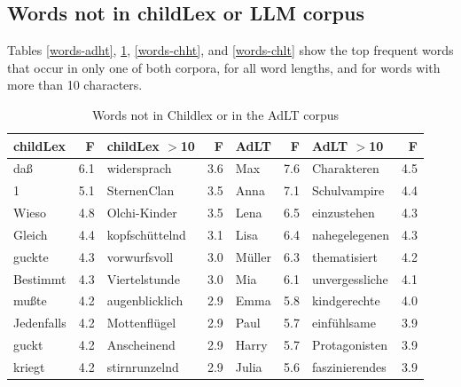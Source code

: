 \documentclass[manuscript]{stjour}
\begin{document}
\clearpage


\subsection{Words not in childLex or LLM corpus}

Tables \ref{words-adht}, \ref{words-adlt}, \ref{words-chht}, and \ref{words-chlt} show the top frequent words that occur in only one of both corpora, for all word lengths, and for words with more than 10 characters.

\begin{table}[!htbp]
\caption{Words not in Childlex or in the AdLT corpus}
\centering
\begin{tabular}{lrlrlrlr}
  \hline
childLex & F & childLex $>$10 & F & AdLT & F & AdLT $>$10 & F \\ 
  \hline
daß & 6.1 & widersprach & 3.6 & Max & 7.6 & Charakteren & 4.5 \\ 
  1 & 5.1 & SternenClan & 3.5 & Anna & 7.1 & Schulvampire & 4.4 \\ 
  Wieso & 4.8 & Olchi-Kinder & 3.5 & Lena & 6.5 & einzustehen & 4.3 \\ 
  Gleich & 4.4 & kopfschüttelnd & 3.1 & Lisa & 6.4 & nahegelegenen & 4.3 \\ 
  guckte & 4.3 & vorwurfsvoll & 3.0 & Müller & 6.3 & thematisiert & 4.2 \\ 
  Bestimmt & 4.3 & Viertelstunde & 3.0 & Mia & 6.1 & unvergessliche & 4.1 \\ 
  mußte & 4.2 & augenblicklich & 2.9 & Emma & 5.8 & kindgerechte & 4.0 \\ 
  Jedenfalls & 4.2 & Mottenflügel & 2.9 & Paul & 5.7 & einfühlsame & 3.9 \\ 
  guckt & 4.2 & Anscheinend & 2.9 & Harry & 5.7 & Protagonisten & 3.9 \\ 
  kriegt & 4.2 & stirnrunzelnd & 2.9 & Julia & 5.6 & faszinierendes & 3.9 \\ 
   \hline
\end{tabular}
\label{words-adlt}
\end{table}
\end{document}
